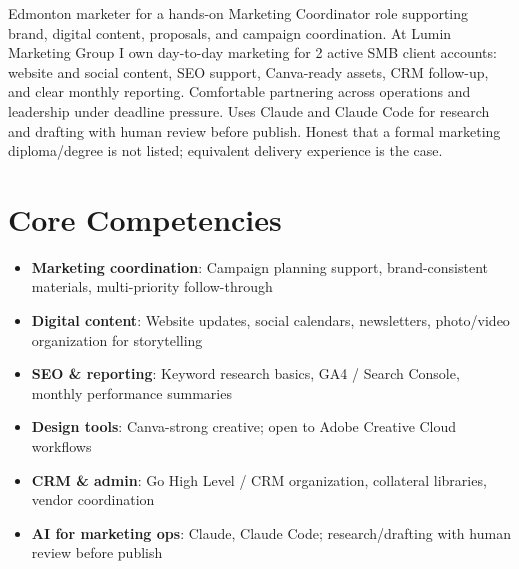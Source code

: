 \documentclass[11pt,a4paper,sans]{moderncv}
\begin{document}
\makecvtitle

\vspace{6pt}
\small{Edmonton marketer for a hands-on Marketing Coordinator role supporting brand, digital content, proposals, and campaign coordination. At Lumin Marketing Group I own day-to-day marketing for 2 active SMB client accounts: website and social content, SEO support, Canva-ready assets, CRM follow-up, and clear monthly reporting. Comfortable partnering across operations and leadership under deadline pressure. Uses Claude and Claude Code for research and drafting with human review before publish. Honest that a formal marketing diploma/degree is not listed; equivalent delivery experience is the case.}

\section{Core Competencies}
\vspace{1pt}
\begin{itemize}
\item \textbf{Marketing coordination}: Campaign planning support, brand-consistent materials, multi-priority follow-through
\item \textbf{Digital content}: Website updates, social calendars, newsletters, photo/video organization for storytelling
\item \textbf{SEO \& reporting}: Keyword research basics, GA4 / Search Console, monthly performance summaries
\item \textbf{Design tools}: Canva-strong creative; open to Adobe Creative Cloud workflows
\item \textbf{CRM \& admin}: Go High Level / CRM organization, collateral libraries, vendor coordination
\item \textbf{AI for marketing ops}: Claude, Claude Code; research/drafting with human review before publish
\end{itemize}
\end{document}
